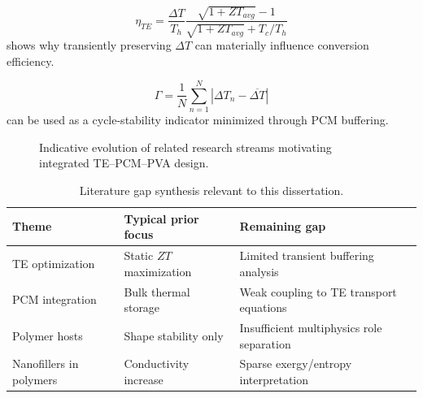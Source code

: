 \begin{equation}\label{eq:lit_eff_gap}
\eta_{TE}=\frac{\Delta T}{T_h}\frac{\sqrt{1+ZT_{avg}}-1}{\sqrt{1+ZT_{avg}}+T_c/T_h}
\end{equation}
shows why transiently preserving $\Delta T$ can materially influence conversion efficiency.

\begin{equation}\label{eq:lit_cycle_metric}
\Gamma=\frac{1}{N}\sum_{n=1}^{N}\left|\Delta T_n-\overline{\Delta T}\right|
\end{equation}
can be used as a cycle-stability indicator minimized through PCM buffering.

\begin{figure}[htbp]
\centering
{}
\caption{Indicative evolution of related research streams motivating integrated TE--PCM--PVA design.}
\label{fig:lit_trends}
\end{figure}

\begin{table}[htbp]
\centering
\caption{Literature gap synthesis relevant to this dissertation.}
\label{tab:lit_gap}
\begin{tabular}{p{4cm}p{3.5cm}p{4.2cm}}
\toprule
Theme & Typical prior focus & Remaining gap \\
\midrule
TE optimization & Static $ZT$ maximization & Limited transient buffering analysis \\
PCM integration & Bulk thermal storage & Weak coupling to TE transport equations \\
Polymer hosts & Shape stability only & Insufficient multiphysics role separation \\
Nanofillers in polymers & Conductivity increase & Sparse exergy/entropy interpretation \\
\bottomrule
\end{tabular}
\end{table}
